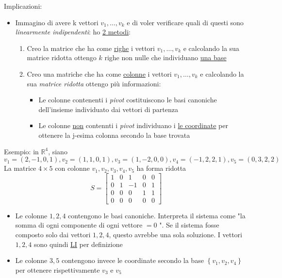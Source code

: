 Implicazioni:
\begin{itemize}
	\item Immagino di avere k vettori $v_1,\ldots,v_k$ e di voler verificare quali di questi sono \textit{linearmente indipendenti}: ho \underline{2 metodi}:
	      \begin{enumerate}
		      \item Creo la matrice che ha come \underline{righe} i vettori $v_1,\ldots,v_k$ e calcolando la sua matrice ridotta ottengo $k$ righe non nulle che individuano \underline{una base}
		      \item Creo una matriche che ha come \underline{colonne} i vettori $v_1,\ldots,v_k$ e calcolando la sua \textit{matrice ridotta} ottengo più informazioni:
		            \begin{itemize}
			            \item Le colonne contenenti i \textit{pivot} costituiscono le basi canoniche dell'insieme individuato dai vettori di partenza
			            \item Le colonne \underline{non} contennti i \textit{pivot} individuano i \underline{le coordinate} per ottenere la j-esima colonna secondo la base trovata
		            \end{itemize}
	      \end{enumerate}
\end{itemize}
Esempio: in $\mathbb{R}^4$, siano
$$
	v_1=(2,-1,0,1), v_2=(1,1,0,1), v_3=(1,-2,0,0), v_4=(-1,2,2,1), v_5=(0,3,2,2)
$$
La matrice $4 \times 5$ con colonne $v_1, v_2, v_3, v_4, v_5$ ha forma ridotta
$$
	S=\left[\begin{array}{rrrrr}
			1 & 0 & 1  & 0 & 0 \\
			0 & 1 & -1 & 0 & 1 \\
			0 & 0 & 0  & 1 & 1 \\
			0 & 0 & 0  & 0 & 0
		\end{array}\right]
$$
\begin{itemize}
	\item Le colonne $1,2,4$ contengono le basi canoniche. Interpreta il sistema come "la somma di ogni componente di ogni vettore $=0$ ". Se il sistema fosse composto solo dai vettori $1,2,4$, questo avrebbe una sola soluzione. I vettori $1,2,4$ sono quindi \underline{LI} per definizione
	\item Le colonne $3,5$ contengono invece le coordinate secondo la base $\left\{ v_1,v_2,v_4 \right\} $ per ottenere rispettivamente $v_3$ e $v_5$
\end{itemize}

